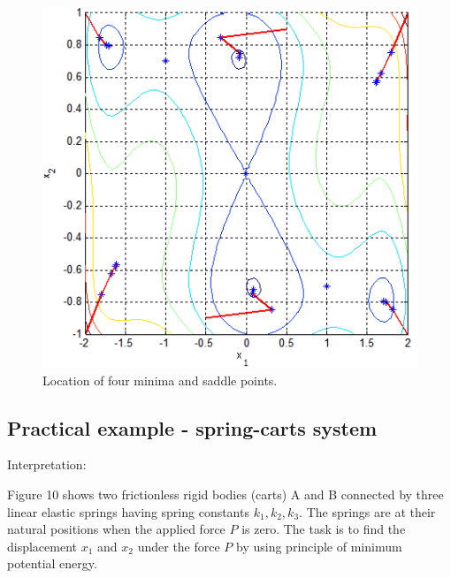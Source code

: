 \documentclass[12pt]{article}
\begin{document}
\begin{figure}[H]
	\begin{center}
		\includegraphics[width=16cm]{gem_results.png}
		\caption{Location of four minima and saddle points.}
	\end{center}
\end{figure}		

\subsection{Practical example - spring-carts system}
Interpretation:

Figure 10 shows two frictionless rigid bodies (carts) A and B connected by three linear elastic springs having spring constants $k_1, k_2, k_3$. The springs are at their natural positions when the applied force $P$ is zero. The task is to find the displacement $x_1$ and $x_2$ under the force $P$ by using principle of minimum potential energy.\cite{practical}
\end{document}
